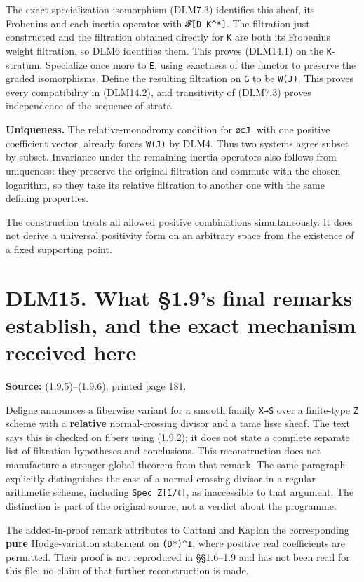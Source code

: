 \documentclass[
]{report}
\begin{document}
The exact specialization isomorphism (DLM7.3) identifies this sheaf, its
Frobenius and each inertia operator with \texttt{𝓕{[}D\_K\^{}*{]}}. The
filtration just constructed and the filtration obtained directly for
\texttt{K} are both its Frobenius weight filtration, so DLM6 identifies
them. This proves (DLM14.1) on the \texttt{K}-stratum. Specialize once
more to \texttt{E}, using exactness of the functor to preserve the
graded isomorphisms. Define the resulting filtration on \texttt{G} to be
\texttt{W(J)}. This proves every compatibility in (DLM14.2), and
transitivity of (DLM7.3) proves independence of the sequence of strata.

\textbf{Uniqueness.} The relative-monodromy condition for \texttt{∅⊂J},
with one positive coefficient vector, already forces \texttt{W(J)} by
DLM4. Thus two systems agree subset by subset. Invariance under the
remaining inertia operators also follows from uniqueness: they preserve
the original filtration and commute with the chosen logarithm, so they
take its relative filtration to another one with the same defining
properties.

The construction treats all allowed positive combinations
simultaneously. It does not derive a universal positivity form on an
arbitrary space from the existence of a fixed supporting point.

\section{DLM15. What §1.9's final remarks establish, and the exact
mechanism received
here}\label{dlm15.-what-1.9s-final-remarks-establish-and-the-exact-mechanism-received-here}

\textbf{Source:} (1.9.5)--(1.9.6), printed page 181.

Deligne announces a fiberwise variant for a smooth family \texttt{X→S}
over a finite-type \texttt{Z} scheme with a \textbf{relative}
normal-crossing divisor and a tame lisse sheaf. The text says this is
checked on fibers using (1.9.2); it does not state a complete separate
list of filtration hypotheses and conclusions. This reconstruction does
not manufacture a stronger global theorem from that remark. The same
paragraph explicitly distinguishes the case of a normal-crossing divisor
in a regular arithmetic scheme, including \texttt{Spec\ Z{[}1/ℓ{]}}, as
inaccessible to that argument. The distinction is part of the original
source, not a verdict about the programme.

The added-in-proof remark attributes to Cattani and Kaplan the
corresponding \textbf{pure} Hodge-variation statement on
\texttt{(D*)\^{}I}, where positive real coefficients are permitted.
Their proof is not reproduced in §§1.6--1.9 and has not been read for
this file; no claim of that further reconstruction is made.
\end{document}
